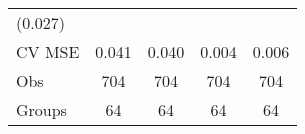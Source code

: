 \documentclass[12pt,twoside]{reedthesis}
\begin{document}
\begin{longtable}[]{@{}lcccc@{}}
\begin{minipage}[t]{0.14\columnwidth}
  (0.027)\strut
  \end{minipage}\tabularnewline
  \begin{minipage}[t]{0.26\columnwidth}\raggedright\strut
  CV MSE\strut
  \end{minipage} & \begin{minipage}[t]{0.12\columnwidth}\centering\strut
  0.041\strut
  \end{minipage} & \begin{minipage}[t]{0.14\columnwidth}\centering\strut
  0.040\strut
  \end{minipage} & \begin{minipage}[t]{0.14\columnwidth}\centering\strut
  0.004\strut
  \end{minipage} & \begin{minipage}[t]{0.14\columnwidth}\centering\strut
  0.006\strut
  \end{minipage}\tabularnewline
  \begin{minipage}[t]{0.26\columnwidth}\raggedright\strut
  Obs\strut
  \end{minipage} & \begin{minipage}[t]{0.12\columnwidth}\centering\strut
  704\strut
  \end{minipage} & \begin{minipage}[t]{0.14\columnwidth}\centering\strut
  704\strut
  \end{minipage} & \begin{minipage}[t]{0.14\columnwidth}\centering\strut
  704\strut
  \end{minipage} & \begin{minipage}[t]{0.14\columnwidth}\centering\strut
  704\strut
  \end{minipage}\tabularnewline
  \begin{minipage}[t]{0.26\columnwidth}\raggedright\strut
  Groups\strut
  \end{minipage} & \begin{minipage}[t]{0.12\columnwidth}\centering\strut
  64\strut
  \end{minipage} & \begin{minipage}[t]{0.14\columnwidth}\centering\strut
  64\strut
  \end{minipage} & \begin{minipage}[t]{0.14\columnwidth}\centering\strut
  64\strut
  \end{minipage} & \begin{minipage}[t]{0.14\columnwidth}\centering\strut
  64\strut
  \end{minipage}\tabularnewline
  \bottomrule
  \end{longtable}
  
\end{document}
